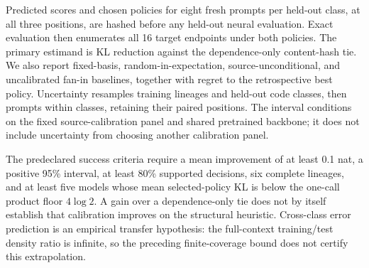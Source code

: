 Predicted scores and chosen policies for eight fresh prompts per held-out class,
at all three positions, are hashed before any held-out neural evaluation.
Exact evaluation then enumerates all 16 target endpoints under both policies.
The primary estimand is KL reduction against the dependence-only content-hash
tie. We also report fixed-basis, random-in-expectation, source-unconditional,
and uncalibrated fan-in baselines, together with regret to the retrospective
best policy. Uncertainty resamples training lineages and held-out code classes,
then prompts within classes, retaining their paired positions. The interval
conditions on the fixed source-calibration panel and shared pretrained backbone;
it does not include uncertainty from choosing another calibration panel.

The predeclared success criteria require a mean improvement of at least 0.1 nat,
a positive 95\% interval, at least 80\% supported decisions, six complete
lineages, and at least five models whose mean selected-policy KL is below the
one-call product floor $4\log2$. A gain over a dependence-only tie does not by
itself establish that calibration improves on the structural heuristic.
Cross-class error prediction is an empirical transfer hypothesis: the full-context
training/test density ratio is infinite, so the preceding finite-coverage bound
does not certify this extrapolation.
